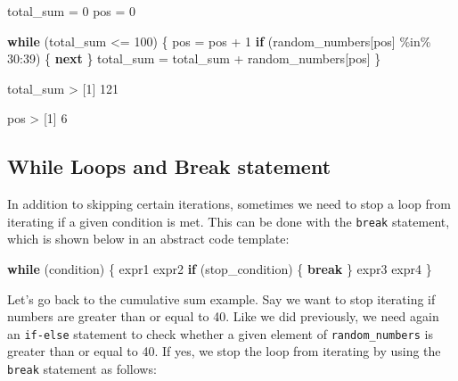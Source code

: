 \documentclass[
]{book}
\newenvironment{Shaded}{\begin{snugshade}}{\end{snugshade}}
\newcommand{\ControlFlowTok}[1]{\textcolor[rgb]{0.13,0.29,0.53}{\textbf{#1}}}
\newcommand{\DecValTok}[1]{\textcolor[rgb]{0.00,0.00,0.81}{#1}}
\newcommand{\NormalTok}[1]{#1}
\newcommand{\OtherTok}[1]{\textcolor[rgb]{0.56,0.35,0.01}{#1}}
\newcommand{\SpecialCharTok}[1]{\textcolor[rgb]{0.00,0.00,0.00}{#1}}
\begin{document}
\begin{Shaded}
\begin{Highlighting}[]
\NormalTok{total\_sum }\OtherTok{=} \DecValTok{0}
\NormalTok{pos }\OtherTok{=} \DecValTok{0}

\ControlFlowTok{while}\NormalTok{ (total\_sum }\SpecialCharTok{\textless{}=} \DecValTok{100}\NormalTok{) \{}
\NormalTok{  pos }\OtherTok{=}\NormalTok{ pos }\SpecialCharTok{+} \DecValTok{1}
  \ControlFlowTok{if}\NormalTok{ (random\_numbers[pos] }\SpecialCharTok{\%in\%} \DecValTok{30}\SpecialCharTok{:}\DecValTok{39}\NormalTok{) \{}
    \ControlFlowTok{next}
\NormalTok{  \}}
\NormalTok{  total\_sum }\OtherTok{=}\NormalTok{ total\_sum }\SpecialCharTok{+}\NormalTok{ random\_numbers[pos]}
\NormalTok{\}}

\NormalTok{total\_sum}
\SpecialCharTok{\textgreater{}}\NormalTok{ [}\DecValTok{1}\NormalTok{] }\DecValTok{121}

\NormalTok{pos}
\SpecialCharTok{\textgreater{}}\NormalTok{ [}\DecValTok{1}\NormalTok{] }\DecValTok{6}
\end{Highlighting}
\end{Shaded}

\hypertarget{while-loops-and-break-statement}{%
\subsection{While Loops and Break statement}\label{while-loops-and-break-statement}}

In addition to skipping certain iterations, sometimes we need to stop a loop
from iterating if a given condition is met. This can be done with the \texttt{break}
statement, which is shown below in an abstract code template:

\begin{Shaded}
\begin{Highlighting}[]
\ControlFlowTok{while}\NormalTok{ (condition) \{ }
\NormalTok{  expr1}
\NormalTok{  expr2}
  \ControlFlowTok{if}\NormalTok{ (stop\_condition) \{}
    \ControlFlowTok{break}
\NormalTok{  \}}
\NormalTok{  expr3}
\NormalTok{  expr4}
\NormalTok{\}}
\end{Highlighting}
\end{Shaded}

Let's go back to the cumulative sum example. Say we want to stop iterating
if numbers are greater than or equal to 40. Like we did previously, we need
again an \texttt{if-else} statement to check whether a given element of
\texttt{random\_numbers} is greater than or equal to 40. If yes, we stop the loop
from iterating by using the \texttt{break} statement as follows:
\end{document}

